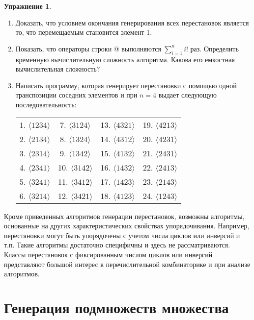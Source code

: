 \documentclass[12pt,a4paper]{article}
\theoremstyle{plain}
\theoremstyle{definition}
\newtheorem*{task}{Упражнение}
\theoremstyle{remark}
\begin{document}
\begin{task}
~\\
\begin{enumerate}
\item Доказать, что условием окончания генерирования всех перестановок является то, что перемещаемым становится элемент 1.
\item Показать, что операторы строки \verb@{*}@ выполняются $\sum_{i=1}^n i!$ раз. Определить временную вычислительную сложность алгоритма. Какова его емкостная вычислительная сложность?
\item Написать программу, которая генерирует перестановки с помощью одной транспозиции соседних элементов и при $n=4$ выдает следующую последовательность: \\
\begin{tabular}{cccc}
1. $\langle1 2 3 4\rangle$ & 7. $\langle3 1 2 4\rangle$  & 13. $\langle4 3 2 1\rangle$ & 19. $\langle4 2 1 3\rangle$ \\
2. $\langle2 1 3 4\rangle$ & 8. $\langle1 3 2 4\rangle$  & 14. $\langle4 3 1 2\rangle$ & 20. $\langle4 2 3 1\rangle$ \\
3. $\langle2 3 1 4\rangle$ & 9. $\langle1 3 4 2\rangle$  & 15. $\langle4 1 3 2\rangle$ & 21. $\langle2 4 3 1\rangle$ \\
4. $\langle2 3 4 1\rangle$ & 10. $\langle3 1 4 2\rangle$ & 16. $\langle1 4 3 2\rangle$ & 22. $\langle2 4 1 3\rangle$ \\ 
5. $\langle3 2 4 1\rangle$ & 11. $\langle3 4 1 2\rangle$ & 17. $\langle1 4 2 3\rangle$ & 23. $\langle2 1 4 3\rangle$ \\
6. $\langle3 2 1 4\rangle$ & 12. $\langle3 4 2 1\rangle$ & 18. $\langle4 1 2 3\rangle$ & 24. $\langle1 2 4 3\rangle$
\end{tabular}
\end{enumerate}
\end{task}

Кроме приведенных алгоритмов генерации перестановок, возможны алгоритмы, основанные на других характеристических свойствах упорядочивания. Например, перестановки могут быть упорядочены с учетом числа циклов или инверсий и т.п. Такие алгоритмы достаточно специфичны и здесь не рассматриваются. Классы перестановок с фиксированным числом циклов или инверсий представляют большой интерес в перечислительной комбинаторике и при анализе алгоритмов.

\section{Генерация подмножеств множества}
\end{document}
